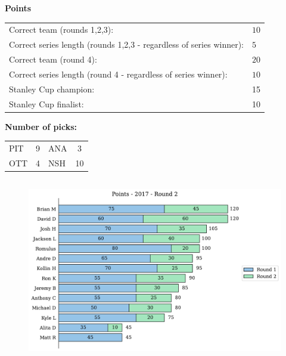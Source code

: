 \documentclass[10pt]{article}
\begin{document}
{\bf Points}\\
\begin{minipage}[t]{12cm}
    \vspace{0pt}
    \begin{tabular}{l l}
        Correct team (rounds 1,2,3):	& $10$\\
        Correct series length (rounds 1,2,3 - regardless of series winner):	& $5$\\
        Correct team (round 4):	& $20$\\
        Correct series length (round 4 - regardless of series winner):	& $10$\\
        Stanley Cup champion:	& 15\\
        Stanley Cup finalist:	& 10\\
    \end{tabular}

    \vspace{0.5cm}
    {\bf Number of picks:}\\
    \begin{tabular}{lc | lc }
        PIT & 9 & ANA & 3 \\
        OTT & 4 & NSH & 10 \\
    \end{tabular}
\end{minipage}
%
\begin{minipage}[t]{13cm}
    \vspace{0pt}
    \begin{figure}[H]
        \vspace{-1cm}
        \includegraphics[width=12cm,height=8cm,keepaspectratio]{../../figures/2017/Points-2017-Round2.pdf}
    \end{figure}
\end{minipage}
\end{document}
